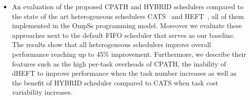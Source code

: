\begin{itemize}
 \item{An evaluation of the proposed CPATH and HYBRID schedulers compared to the state of the art heterogeneous schedulers CATS~\cite{Chronaki:ICS2015} and HEFT~\cite{HEFT}, all of them implemented in the OmpSs programming model. Moreover we evaluate these approaches next to the default FIFO scheduler that serves as our baseline.
The results show that all heterogeneous schedulers improve overall performance reaching up to 45\% improvement. Furthermore, we describe their features such as the high per-task overheads of CPATH, the inability of dHEFT to improve performance when the task number increases as well as the benefit of HYBRID scheduler compared to CATS when task cost variability increases.
}


\end{itemize}
